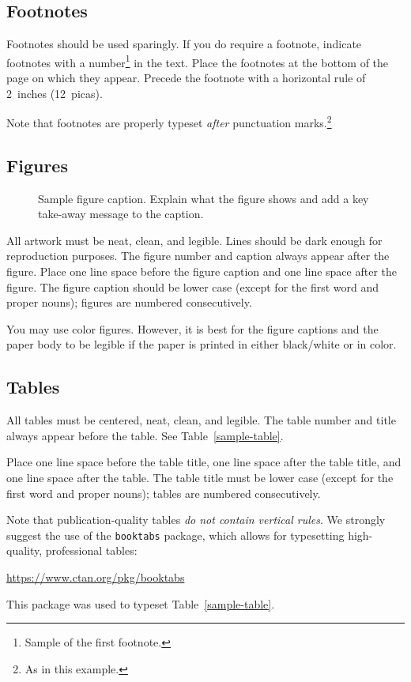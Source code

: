 \documentclass{article}
\begin{document}
\subsection{Footnotes}


Footnotes should be used sparingly.  If you do require a footnote, indicate
footnotes with a number\footnote{Sample of the first footnote.} in the
text. Place the footnotes at the bottom of the page on which they appear.
Precede the footnote with a horizontal rule of 2~inches (12~picas).


Note that footnotes are properly typeset \emph{after} punctuation
marks.\footnote{As in this example.}


\subsection{Figures}


\begin{figure}
  \centering
  \fbox{\rule[-.5cm]{0cm}{4cm} \rule[-.5cm]{4cm}{0cm}}
  \caption{Sample figure caption. Explain what the figure shows and add a key take-away message to the caption.}
\end{figure}


All artwork must be neat, clean, and legible. Lines should be dark enough for
 reproduction purposes. The figure number and caption always appear after the
figure. Place one line space before the figure caption and one line space after
the figure. The figure caption should be lower case (except for the first word and proper nouns); figures are numbered consecutively.


You may use color figures.  However, it is best for the figure captions and the
paper body to be legible if the paper is printed in either black/white or in
color.


\subsection{Tables}


All tables must be centered, neat, clean, and legible.  The table number and
title always appear before the table.  See Table~\ref{sample-table}.


Place one line space before the table title, one line space after the
table title, and one line space after the table. The table title must
be lower case (except for the first word and proper nouns); tables are
numbered consecutively.


Note that publication-quality tables \emph{do not contain vertical rules}. We
strongly suggest the use of the \verb+booktabs+ package, which allows for
typesetting high-quality, professional tables:
\begin{center}
  \url{https://www.ctan.org/pkg/booktabs}
\end{center}
This package was used to typeset Table~\ref{sample-table}.
\end{document}
